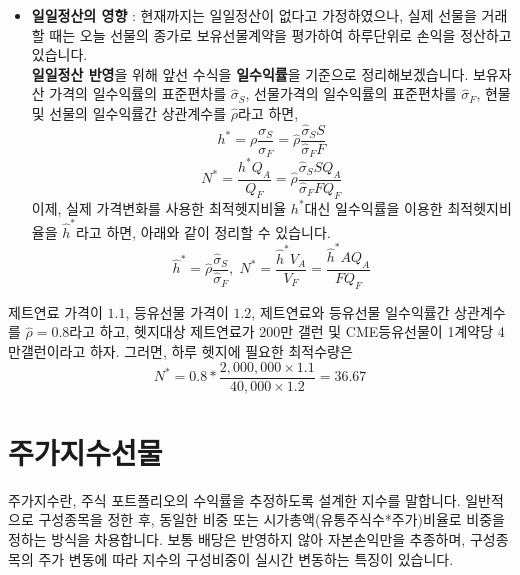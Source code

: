 \documentclass[
  letterpaper,
  DIV=11,
  numbers=noendperiod]{scrreprt}
\providecommand{\tightlist}{%
  \setlength{\itemsep}{0pt}\setlength{\parskip}{0pt}}\usepackage{longtable,booktabs,array}
\begin{document}
\begin{itemize}
\tightlist
\item
  \textbf{일일정산의 영향} : 현재까지는 일일정산이 없다고 가정하였으나,
  실제 선물을 거래할 때는 오늘 선물의 종가로 보유선물계약을 평가하여
  하루단위로 손익을 정산하고 있습니다.\\
  \textbf{일일정산 반영}을 위해 앞선 수식을 \textbf{일수익률}을 기준으로
  정리해보겠습니다. 보유자산 가격의 일수익률의 표준편차를
  \(\hat{\sigma}_S\), 선물가격의 일수익률의 표준편차를
  \(\hat{\sigma}_F\), 현물 및 선물의 일수익률간 상관계수를
  \(\hat{\rho}\)라고 하면,
  \[h^*=\rho \frac{\sigma _S}{\sigma _F}=\hat{\rho} \frac{\hat{\sigma} _S S}{\hat{\sigma} _F F}\]
  \[N^*=\frac{h^* Q_A}{Q_F}=\hat{\rho} \frac{\hat{\sigma} _S S Q_A}{\hat{\sigma} _F F Q_F}\]
  이제, 실제 가격변화를 사용한 최적헷지비율 \(h^*\)대신 일수익률을
  이용한 최적헷지비율을 \(\hat{h}^*\)라고 하면, 아래와 같이 정리할 수
  있습니다.
  \[\hat{h}^*=\hat{\rho} \frac{\hat{\sigma} _S}{\hat{\sigma} _F},\; N^*=\frac{\hat{h}^* V_A}{V_F}=\frac{\hat{h}^* A Q_A}{F Q_F}\]
\end{itemize}

\begin{tcolorbox}[enhanced jigsaw, titlerule=0mm, bottomtitle=1mm, left=2mm, title=\textcolor{quarto-callout-note-color}{\faInfo}\hspace{0.5em}{최적헷지비율 및 계약수 예시2}, toptitle=1mm, bottomrule=.15mm, colframe=quarto-callout-note-color-frame, breakable, opacityback=0, rightrule=.15mm, opacitybacktitle=0.6, coltitle=black, colback=white, arc=.35mm, colbacktitle=quarto-callout-note-color!10!white, toprule=.15mm, leftrule=.75mm]

제트연료 가격이 \(1.1\), 등유선물 가격이 \(1.2\), 제트연료와 등유선물
일수익률간 상관계수를 \(\hat{\rho} = 0.8\)라고 하고, 헷지대상 제트연료가
200만 갤런 및 CME등유선물이 1계약당 4만갤런이라고 하자. 그러면, 하루
헷지에 필요한 최적수량은
\[N^*=0.8*\frac{2,000,000 \times 1.1}{40,000 \times 1.2}=36.67\]

\end{tcolorbox}

\section*{주가지수선물}\label{uxc8fcuxac00uxc9c0uxc218uxc120uxbb3c}


주가지수란, 주식 포트폴리오의 수익률을 추정하도록 설계한 지수를
말합니다. 일반적으로 구성종목을 정한 후, 동일한 비중 또는
시가총액(유통주식수*주가)비율로 비중을 정하는 방식을 차용합니다. 보통
배당은 반영하지 않아 자본손익만을 추종하며, 구성종목의 주가 변동에 따라
지수의 구성비중이 실시간 변동하는 특징이 있습니다.
\end{document}
